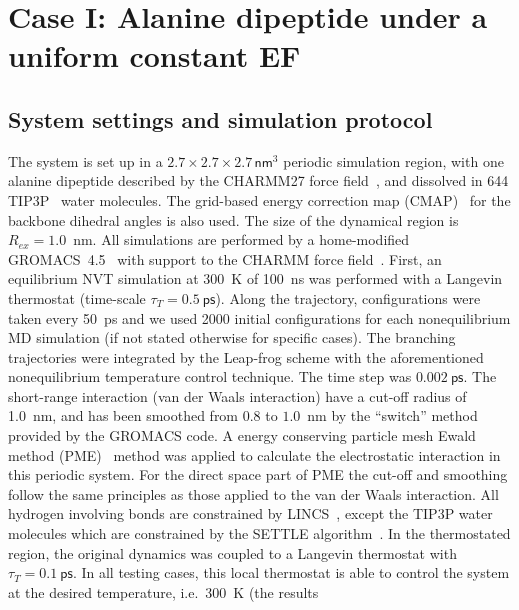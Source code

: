 \documentclass[a4paper,preprint,unsortedaddress,onecolumn]{revtex4-1}
\newcommand{\recheck}[1]{{\color{red} #1}}
\newcommand{\vect}[1]{\textbf{\textit{#1}}}
\begin{document}
\section{Case I: Alanine dipeptide
  under a uniform  constant EF}

\subsection{System settings and simulation protocol}
The system is set up in a $2.7\times 2.7\times
2.7\, \textsf{nm}^3$ periodic simulation region, with one alanine dipeptide
described by the CHARMM27 force field~\cite{foloppe2000all}, and dissolved in 644 TIP3P~\cite{jorgensen1983comparison}
water molecules.  \recheck{The grid-based energy correction map (CMAP)~\cite{mackerell2004extending}
for the backbone dihedral angles is also used.}
The size of the  dynamical region is $R_{ex} = 1.0$~nm.
All simulations are performed by a home-modified GROMACS~4.5~\cite{pronk2013gromacs} with support to the CHARMM
force field~\cite{bjelkmar2010implementation}.
First, an equilibrium NVT simulation at 300~K of
100~\textsf{ns} was performed with a Langevin thermostat (time-scale
$\tau_T = 0.5~\textsf{ps}$).  Along the trajectory, configurations were taken every
50~\textsf{ps} and we used 2000 initial configurations for each nonequilibrium
MD simulation (if not stated otherwise for specific cases).
The branching trajectories were integrated by the
Leap-frog scheme with the aforementioned nonequilibrium
temperature control technique.  The
time step was $0.002~\textsf{ps}$.
\recheck{The short-range
interaction (van der Waals interaction)
have a cut-off radius of 1.0~nm, and has been smoothed from $0.8$ to $1.0$~nm by the
``switch'' method provided by the GROMACS code.
A energy conserving particle mesh Ewald method (PME)~\cite{darden1993pme, essmann1995spm}
method was applied to calculate the electrostatic interaction in this
periodic system. For the direct space part of PME the cut-off and smoothing follow the same principles as those applied to the van der Waals interaction.}
\recheck {All hydrogen involving bonds are constrained by LINCS~\cite{hess1997lincs}, except 
  the TIP3P water molecules which are constrained by the SETTLE algorithm~\cite{miyamoto2004settle}.}
In the thermostated region, the original dynamics was
coupled to a Langevin thermostat with $\tau_T = 0.1~\textsf{ps}$.
  In all testing cases, this local thermostat is able to control
  the system at the desired temperature, i.e.~300~K (the results
\end{document}
